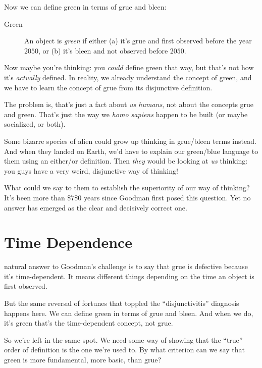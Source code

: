 \documentclass[justified]{tufte-book}
\theoremstyle{definition}
\theoremstyle{definition}
\theoremstyle{definition}
\theoremstyle{remark}
\begin{document}
Now we can define green in terms of grue and bleen:

\begin{description}
\item[Green]
An object is \emph{green} if either (a) it's grue and first observed
before the year \(2050\), or (b) it's bleen and not observed before
\(2050\).
\end{description}

Now maybe you're thinking: you \emph{could} define green that way, but
that's not how it's \emph{actually} defined. In reality, we already
understand the concept of green, and we have to learn the concept of
grue from its disjunctive definition.

The problem is, that's just a fact about \emph{us humans}, not about the
concepts grue and green. That's just the way we \emph{homo sapiens}
happen to be built (or maybe socialized, or both).

Some bizarre species of alien could grow up thinking in grue/bleen terms
instead. And when they landed on Earth, we'd have to explain our
green/blue language to them using an either/or definition. Then
\emph{they} would be looking at \emph{us} thinking: you guys have a very
weird, disjunctive way of thinking!

What could we say to them to establish the superiority of our way of
thinking? It's been more than \$7\$0 years since Goodman first posed
this question. Yet no answer has emerged as the clear and decisively
correct one.

\hypertarget{time-dependence}{%
\section*{Time Dependence}\label{time-dependence}}

 natural answer to Goodman's challenge is to say
that grue is defective because it's time-dependent. It means different
things depending on the time an object is first observed.

But the same reversal of fortunes that toppled the ``disjunctivitis''
diagnosis happens here. We can define green in terms of grue and bleen.
And when we do, it's green that's the time-dependent concept, not grue.

So we're left in the same spot. We need some way of showing that the
``true'' order of definition is the one we're used to. By what criterion
can we say that green is more fundamental, more basic, than grue?
\end{document}
